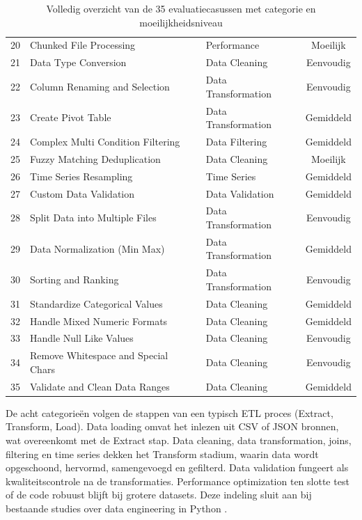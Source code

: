 \begin{table}[htbp]
\begin{tabular}{cllc}
20 & Chunked File Processing            & Performance        & Moeilijk \\
21 & Data Type Conversion               & Data Cleaning      & Eenvoudig \\
22 & Column Renaming and Selection      & Data Transformation & Eenvoudig \\
23 & Create Pivot Table                 & Data Transformation & Gemiddeld \\
24 & Complex Multi Condition Filtering  & Data Filtering     & Gemiddeld \\
25 & Fuzzy Matching Deduplication       & Data Cleaning      & Moeilijk \\
26 & Time Series Resampling             & Time Series        & Gemiddeld \\
27 & Custom Data Validation             & Data Validation    & Gemiddeld \\
28 & Split Data into Multiple Files     & Data Transformation & Eenvoudig \\
29 & Data Normalization (Min Max)       & Data Transformation & Gemiddeld \\
30 & Sorting and Ranking                & Data Transformation & Eenvoudig \\
31 & Standardize Categorical Values     & Data Cleaning      & Gemiddeld \\
32 & Handle Mixed Numeric Formats       & Data Cleaning      & Gemiddeld \\
33 & Handle Null Like Values            & Data Cleaning      & Eenvoudig \\
34 & Remove Whitespace and Special Chars& Data Cleaning      & Eenvoudig \\
35 & Validate and Clean Data Ranges     & Data Cleaning      & Gemiddeld \\
\bottomrule
\end{tabular}
\caption{Volledig overzicht van de 35 evaluatiecasussen met categorie en moeilijkheidsniveau}
\label{tab:casusoverzicht}
\end{table}

De acht categorieën volgen de stappen van een typisch ETL proces (Extract, Transform, Load). Data loading omvat het inlezen uit CSV of JSON bronnen, wat overeenkomt met de Extract stap. Data cleaning, data transformation, joins, filtering en time series dekken het Transform stadium, waarin data wordt opgeschoond, hervormd, samengevoegd en gefilterd. Data validation fungeert als kwaliteitscontrole na de transformaties. Performance optimization ten slotte test of de code robuust blijft bij grotere datasets. Deze indeling sluit aan bij bestaande studies over data engineering in Python \autocite{Kabir2024,Nascimento2024,Wei2025}.

